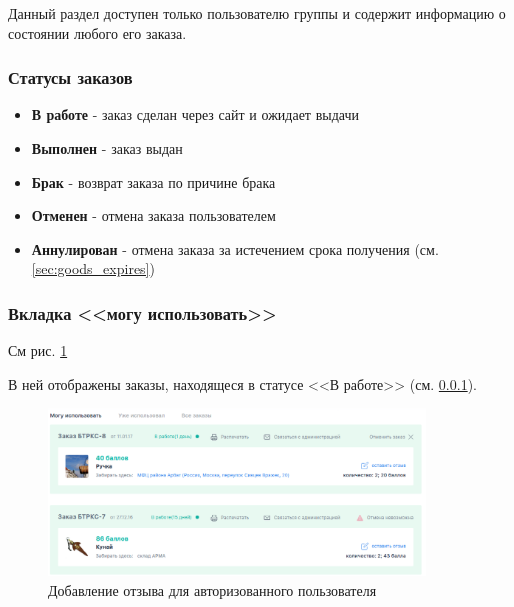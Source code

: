             Данный раздел доступен только пользователю группы 
            и содержит информацию о состоянии любого его заказа.

            \subsubsection{Статусы заказов}\label{sec:auth_order_statuses}
            
            \begin{itemize}
                \item \textbf{В работе} - заказ сделан через сайт и ожидает 
                выдачи
                \item \textbf{Выполнен} - заказ выдан
                \item \textbf{Брак} - возврат заказа по причине брака
                \item \textbf{Отменен} - отмена заказа пользователем
                \item \textbf{Аннулирован} - отмена заказа за истечением 
                срока получения
                (см. \ref{sec:goods_expires})

            \end{itemize}

            \subsubsection{Вкладка <<могу использовать>>}
            См рис. \ref{fig:auth_orders_may_use}

            В ней отображены заказы, находящеся в статусе <<В работе>> (см.
            \ref{sec:auth_order_statuses}).

            \begin{figure}
                \center
                \includegraphics[width=100mm]{04_auth_funcs/figures/08.eps}
                \caption{Добавление отзыва для авторизованного пользователя}
                \label{fig:auth_orders_may_use}
            \end{figure}

